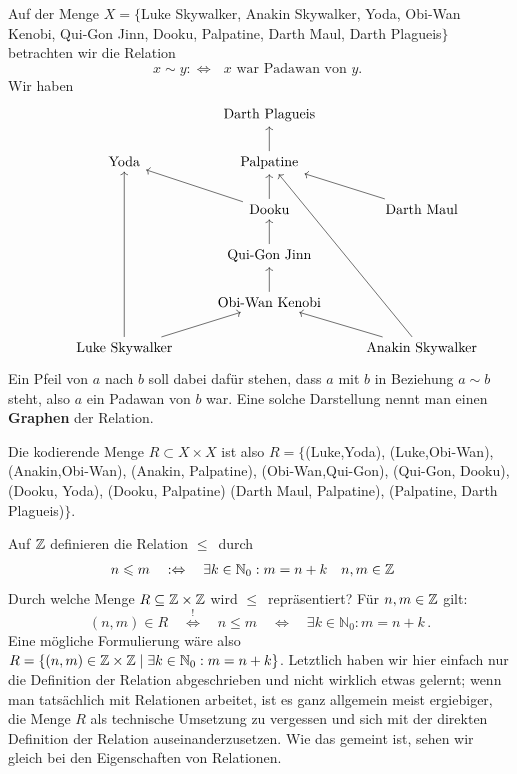 \begin{bsp}\label{bsp:starwars}
	Auf der Menge $X=\{$Luke Skywalker, Anakin Skywalker, Yoda, Obi-Wan Kenobi, Qui-Gon Jinn, Dooku, Palpatine, Darth Maul, Darth Plagueis$\}$ betrachten wir die Relation
		\[ x \sim y :\Longleftrightarrow \text{ $x$ war Padawan von $y$. } \]
	Wir haben
		\[\begin{tikzcd}
			&		& \text{Darth Plagueis} & \\
			& \text{Yoda} & \text{Palpatine} \ar[u] & \\
			& 		& \text{Dooku}\ar[u]\ar[ul] & \text{Darth Maul}\ar[ul] \\
			&		& \text{Qui-Gon Jinn} \ar[u] &\\
			&		& \text{Obi-Wan Kenobi} \ar[u] & \\
			& \text{Luke Skywalker}\ar[uuuu]\ar[ur]	& &\text{Anakin Skywalker}\ar[ul]\ar[uuuul]
		\end{tikzcd}\]
	Ein Pfeil von $a$ nach $b$ soll dabei dafür stehen, dass $a$ mit $b$ in Beziehung $a\sim b$ steht, also $a$ ein Padawan von $b$ war. Eine solche Darstellung nennt man einen \textbf{Graphen} der Relation.
	
	Die kodierende Menge $R\subset X\times X$ ist also $R = \big\{$(Luke,Yoda), (Luke,Obi-Wan), (Anakin,Obi-Wan), (Anakin, Palpatine), (Obi-Wan,Qui-Gon), (Qui-Gon, Dooku), (Dooku, Yoda), (Dooku, Palpatine) (Darth Maul, Palpatine), (Palpatine, Darth Plagueis)$\big\}$.
\end{bsp}

\begin{bsp}\label{bsp:leq}
	Auf ${\mathbb Z}$ definieren die Relation \glqq$\leq$\grqq\, durch
\begin{align*}
 n\leqslant m \quad &:\Leftrightarrow\quad \exists k\in\mathbb{N}_0: m=n+k  && n,m\in {\mathbb Z}
\end{align*}
	Durch welche Menge $R\subseteq{\mathbb Z}\times{\mathbb Z}$ wird \glqq$\leq$\grqq\, repräsentiert? Für $n,m\in {\mathbb Z}$ gilt: 
		\[ (n,m)\in R\quad \overset{!}{\Leftrightarrow}\quad n\leq m \quad\Leftrightarrow\quad \exists k\in\mathbb{N}_0: m=n+k \,. \]
	Eine mögliche Formulierung wäre also \( R = \left\{(n,m)\in{\mathbb Z}\times{\mathbb Z}\mid\exists k\in\mathbb{N}_0: m=n+k\right\} \). Letztlich haben wir hier einfach nur die Definition der Relation abgeschrieben und nicht wirklich etwas gelernt; wenn man tatsächlich mit Relationen arbeitet, ist es ganz allgemein meist ergiebiger, die Menge $R$ als technische Umsetzung zu vergessen und sich mit der direkten Definition der Relation auseinanderzusetzen. Wie das gemeint ist, sehen wir gleich bei den Eigenschaften von Relationen.
\end{bsp}

